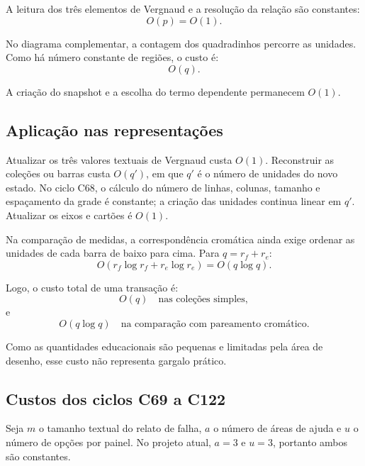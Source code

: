 \documentclass[12pt,a4paper]{article}
\begin{document}
A leitura dos três elementos de Vergnaud e a resolução da relação são constantes:
\[
O(p)=O(1).
\]

No diagrama complementar, a contagem dos quadradinhos percorre as unidades. Como há número constante de regiões, o custo é:
\[
O(q).
\]

A criação do snapshot e a escolha do termo dependente permanecem $O(1)$.

\subsection{Aplicação nas representações}

Atualizar os três valores textuais de Vergnaud custa $O(1)$. Reconstruir as coleções ou barras custa $O(q')$, em que $q'$ é o número de unidades do novo estado. No ciclo C68, o cálculo do número de linhas, colunas, tamanho e espaçamento da grade é constante; a criação das unidades continua linear em $q'$. Atualizar os eixos e cartões é $O(1)$.

Na comparação de medidas, a correspondência cromática ainda exige ordenar as unidades de cada barra de baixo para cima. Para $q=r_f+r_e$:
\[
O(r_f\log r_f+r_e\log r_e)=O(q\log q).
\]

Logo, o custo total de uma transação é:
\[
O(q) \quad \text{nas coleções simples},
\]
e
\[
O(q\log q) \quad \text{na comparação com pareamento cromático}.
\]

Como as quantidades educacionais são pequenas e limitadas pela área de desenho, esse custo não representa gargalo prático.

\subsection{Custos dos ciclos C69 a C122}
Seja $m$ o tamanho textual do relato de falha, $a$ o número de áreas de ajuda e $u$ o número de opções por painel. No projeto atual, $a=3$ e $u=3$, portanto ambos são constantes.
\end{document}

